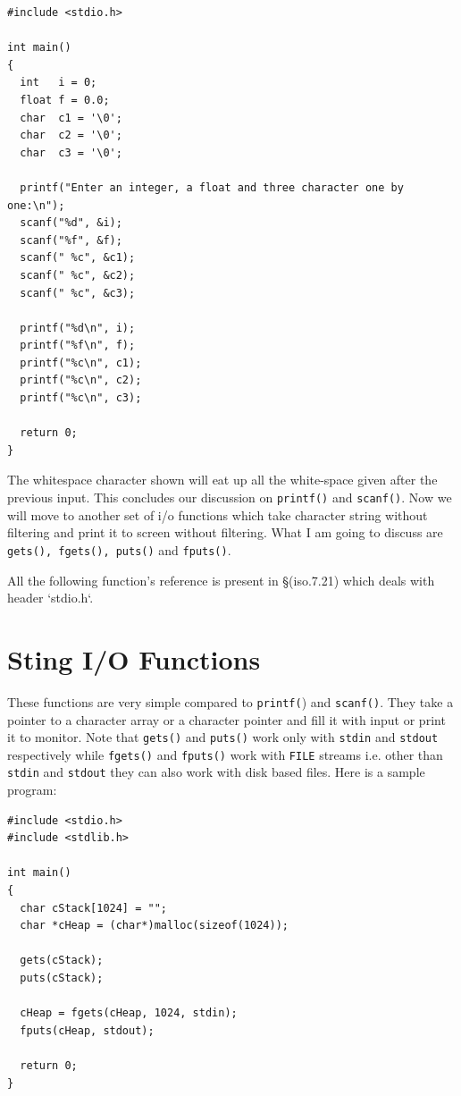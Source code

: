 \begin{verbatim}
#include <stdio.h>

int main()
{
  int   i = 0;
  float f = 0.0;
  char  c1 = '\0';
  char  c2 = '\0';
  char  c3 = '\0';

  printf("Enter an integer, a float and three character one by one:\n");
  scanf("%d", &i);
  scanf("%f", &f);
  scanf(" %c", &c1);
  scanf(" %c", &c2);
  scanf(" %c", &c3);

  printf("%d\n", i);
  printf("%f\n", f);
  printf("%c\n", c1);
  printf("%c\n", c2);
  printf("%c\n", c3);

  return 0;
}
\end{verbatim}

The whitespace character shown will eat up all the white-space given after the
previous input. This concludes our discussion on \texttt{printf()} and
\texttt{scanf()}. Now we will move to another set of i/o functions which take
character string without filtering and print it to screen without
filtering. What I am going to discuss are \texttt{gets(), fgets(), puts()} and
\texttt{fputs()}.

All the following function's reference is present in \S(iso.7.21) which deals with
header `stdio.h`.

\section{Sting I/O Functions}
These functions are very simple compared to \texttt{printf(}) and
\texttt{scanf()}. They take a pointer to a character array or a character
pointer and fill it with input or print it to monitor. Note that
\texttt{gets()} and \texttt{puts()} work only with \texttt{stdin} and
\texttt{stdout} respectively while \texttt{fgets()} and \texttt{fputs()} work
with \texttt{FILE} streams i.e. other than \texttt{stdin} and \texttt{stdout}
they can also work with disk based files. Here is a sample program:

\begin{verbatim}
#include <stdio.h>
#include <stdlib.h>

int main()
{
  char cStack[1024] = "";
  char *cHeap = (char*)malloc(sizeof(1024));

  gets(cStack);
  puts(cStack);

  cHeap = fgets(cHeap, 1024, stdin);
  fputs(cHeap, stdout);

  return 0;
}
\end{verbatim}

